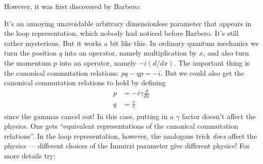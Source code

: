 \documentclass{article}
\def\tightlist{}
\renewcommand{\texttt}[1]{%
  \begingroup
  \ttfamily
  \begingroup\lccode`~=`/\lowercase{\endgroup\def~}{/\discretionary{}{}{}}%
  \begingroup\lccode`~=`[\lowercase{\endgroup\def~}{[\discretionary{}{}{}}%
  \begingroup\lccode`~=`.\lowercase{\endgroup\def~}{.\discretionary{}{}{}}%
  \catcode`/=\active\catcode`[=\active\catcode`.=\active
  \scantokens{#1\noexpand}%
  \endgroup
}
\begin{document}

However, it was first discovered by Barbero:


It's an annoying unavoidable arbitrary dimensionless parameter that
appears in the loop representation, which nobody had noticed before
Barbero. It's still rather mysterious. But it works a bit like this. In
ordinary quantum mechanics we turn the position \(q\) into an operator,
namely multiplication by \(x\), and also turn the momentum \(p\) into an
operator, namely \(-i(d/dx)\). The important thing is the canonical
commutation relations: \(pq-qp=-i\). But we could also get the canonical
commutation relations to hold by defining \[
  \begin{aligned}
    p &= -i \gamma \frac{d}{dx}
  \\q &= \frac{x}{\gamma}
  \end{aligned}
\] since the gammas cancel out! In this case, putting in a \(\gamma\)
factor doesn't affect the physics. One gets ``equivalent representations
of the canonical commutation relations''. In the loop representation,
however, the analogous trick \emph{does} affect the physics ---
different choices of the Immirzi parameter give different physics! For
more details try:

\end{document}
